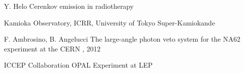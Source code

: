 \documentclass[aspectratio=1610, 10pt]{beamer}
\begin{document}
\begin{frame}[allowframebreaks]
\begin{thebibliography}{10}
            Y. Helo
            \newblock  Cerenkov emission in radiotherapy

            Kamioka Observatory, ICRR, University of Tokyo
            \newblock  Super-Kamiokande

            F. Ambrosino, B. Angelucci
            \newblock  The large-angle photon veto system for the NA62 experiment at the CERN
            , 2012

            ICCEP Collaboration
            \newblock OPAL Experiment at LEP
      \end{thebibliography}
\end{frame}
\end{document}
